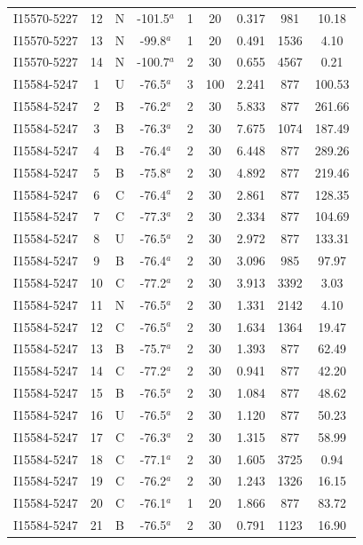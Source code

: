 \begin{table}
\begin{tabular}{ccccccccc}
I15570-5227 & 12 & N & -101.5$^{a}$ & 1 & 20 & 0.317 & 981 & 10.18 \\
I15570-5227 & 13 & N & -99.8$^{a}$ & 1 & 20 & 0.491 & 1536 & 4.10 \\
I15570-5227 & 14 & N & -100.7$^{a}$ & 2 & 30 & 0.655 & 4567 & 0.21 \\
I15584-5247 & 1 & U & -76.5$^{a}$ & 3 & 100 & 2.241 & 877 & 100.53 \\
I15584-5247 & 2 & B & -76.2$^{a}$ & 2 & 30 & 5.833 & 877 & 261.66 \\
I15584-5247 & 3 & B & -76.3$^{a}$ & 2 & 30 & 7.675 & 1074 & 187.49 \\
I15584-5247 & 4 & B & -76.4$^{a}$ & 2 & 30 & 6.448 & 877 & 289.26 \\
I15584-5247 & 5 & B & -75.8$^{a}$ & 2 & 30 & 4.892 & 877 & 219.46 \\
I15584-5247 & 6 & C & -76.4$^{a}$ & 2 & 30 & 2.861 & 877 & 128.35 \\
I15584-5247 & 7 & C & -77.3$^{a}$ & 2 & 30 & 2.334 & 877 & 104.69 \\
I15584-5247 & 8 & U & -76.5$^{a}$ & 2 & 30 & 2.972 & 877 & 133.31 \\
I15584-5247 & 9 & B & -76.4$^{a}$ & 2 & 30 & 3.096 & 985 & 97.97 \\
I15584-5247 & 10 & C & -77.2$^{a}$ & 2 & 30 & 3.913 & 3392 & 3.03 \\
I15584-5247 & 11 & N & -76.5$^{a}$ & 2 & 30 & 1.331 & 2142 & 4.10 \\
I15584-5247 & 12 & C & -76.5$^{a}$ & 2 & 30 & 1.634 & 1364 & 19.47 \\
I15584-5247 & 13 & B & -75.7$^{a}$ & 2 & 30 & 1.393 & 877 & 62.49 \\
I15584-5247 & 14 & C & -77.2$^{a}$ & 2 & 30 & 0.941 & 877 & 42.20 \\
I15584-5247 & 15 & B & -76.5$^{a}$ & 2 & 30 & 1.084 & 877 & 48.62 \\
I15584-5247 & 16 & U & -76.5$^{a}$ & 2 & 30 & 1.120 & 877 & 50.23 \\
I15584-5247 & 17 & C & -76.3$^{a}$ & 2 & 30 & 1.315 & 877 & 58.99 \\
I15584-5247 & 18 & C & -77.1$^{a}$ & 2 & 30 & 1.605 & 3725 & 0.94 \\
I15584-5247 & 19 & C & -76.2$^{a}$ & 2 & 30 & 1.243 & 1326 & 16.15 \\
I15584-5247 & 20 & C & -76.1$^{a}$ & 1 & 20 & 1.866 & 877 & 83.72 \\
I15584-5247 & 21 & B & -76.5$^{a}$ & 2 & 30 & 0.791 & 1123 & 16.90 \\

\end{tabular}
\end{table}
